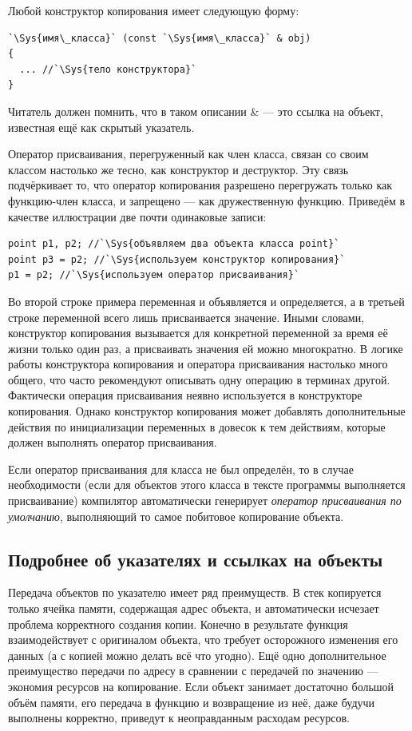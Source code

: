 Любой конструктор копирования имеет следующую форму:
\begin{lstlisting}
`\Sys{имя\_класса}` (const `\Sys{имя\_класса}` & obj) 
{
  ... //`\Sys{тело конструктора}`
}
\end{lstlisting}

Читатель должен помнить, что в таком описании \& --- это ссылка на объект, известная ещё
как скрытый указатель.

Оператор присваивания, перегруженный как член класса, связан со своим классом настолько же тесно, как конструктор и
деструктор. Эту связь подчёркивает то, что оператор копирования разрешено перегружать только как функцию-член класса, и
запрещено --- как дружественную функцию. Приведём в качестве иллюстрации две почти одинаковые записи:
\begin{lstlisting}
point p1, p2; //`\Sys{объявляем два объекта класса point}`
point p3 = p2; //`\Sys{используем конструктор копирования}`
p1 = p2; //`\Sys{используем оператор присваивания}`
\end{lstlisting}

Во второй строке примера переменная   и объявляется и определяется, а в третьей  строке
переменной  всего лишь присваивается значение. Иными словами, конструктор копирования
вызывается для конкретной переменной за время её жизни только один раз, а присваивать значения ей можно многократно. В
логике работы конструктора копирования и оператора присваивания настолько много общего, что часто рекомендуют
описывать одну операцию в терминах другой. Фактически операция  присваивания неявно используется в конструкторе
копирования. Однако конструктор копирования может добавлять дополнительные действия по инициализации переменных в
довесок к тем действиям, которые должен выполнять оператор присваивания.

Если оператор присваивания для класса не был определён, то в случае необходимости (если для объектов этого класса в
тексте программы выполняется присваивание) компилятор автоматически генерирует \emph{оператор присваивания
по умолчанию},  выполняющий то самое побитовое копирование объекта.

\subsection[Подробнее об указателях и ссылках на объекты]{Подробнее об указателях и ссылках на объекты}\label{ch10:2.2}

Передача объектов по указателю имеет ряд преимуществ.  В стек копируется только
ячейка памяти, содержащая адрес объекта, и автоматически исчезает проблема корректного создания копии. Конечно в
результате функция взаимодействует с оригиналом объекта, что требует осторожного изменения его данных (а с копией можно
делать всё что угодно). Ещё одно дополнительное преимущество передачи по адресу в сравнении с передачей по значению ---
экономия ресурсов на копирование. Если объект занимает достаточно большой объём памяти, его передача в функцию и
возвращение из неё, даже будучи выполнены корректно, приведут к неоправданным расходам ресурсов.

